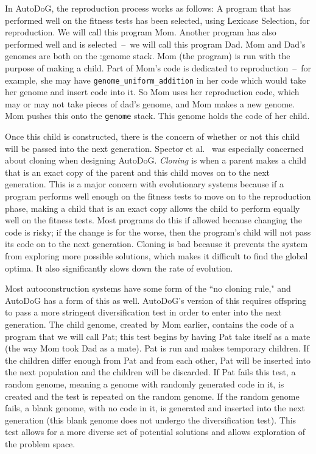\documentclass{sig-alternate}
\begin{document}
In AutoDoG, the reproduction process works as follows:
A program that has performed well on the fitness tests has been selected, using Lexicase Selection, for reproduction. We will call this program Mom. Another program has also performed well and is selected~--~we will call this program Dad. Mom and Dad's genomes are both on the :genome stack. Mom (the program) is run with the purpose of making a child. Part of Mom's code is dedicated to reproduction~--~for example, she may have \texttt{genome\_uniform\_addition} in her code which would take her genome and insert code into it. So Mom uses her reproduction code, which may or may not take pieces of dad's genome, and Mom makes a new genome. Mom pushes this onto the \texttt{genome} stack. This genome holds the code of her child.

Once this child is constructed, there is the concern of whether or not this child will be passed into the next generation. Spector et al.~\cite{spector:2016} was especially concerned about cloning when designing AutoDoG. \textit{Cloning} is when a parent makes a child that is an exact copy of the parent and this child moves on to the next generation. This is a major concern with evolutionary systems because if a program performs well enough on the fitness tests to move on to the reproduction phase, making a child that is an exact copy allows the child to perform equally well on the fitness tests. Most programs do this if allowed because changing the code is risky; if the change is for the worse, then the program's child will not pass its code on to the next generation. Cloning is bad because it prevents the system from exploring more possible solutions, which makes it difficult to find the global optima. It also significantly slows down the rate of evolution.

Most autoconstruction systems have some form of the ``no cloning rule," and AutoDoG has a form of this as well. AutoDoG's version of this requires offspring to pass a more stringent diversification test in order to enter into the next generation. The child genome, created by Mom earlier, contains the code of a program that we will call Pat; this test begins by having Pat take itself as a mate (the way Mom took Dad as a mate). Pat is run and makes temporary children. If the children differ enough from Pat and from each other, Pat will be inserted into the next population and the children will be discarded. If Pat fails this test, a random genome, meaning a genome with randomly generated code in it, is created and the test is repeated on the random genome. If the random genome fails, a blank genome, with no code in it, is generated and inserted into the next generation (this blank genome does not undergo the diversification test). This test allows for a more diverse set of potential solutions and allows exploration of the problem space.
\end{document}
